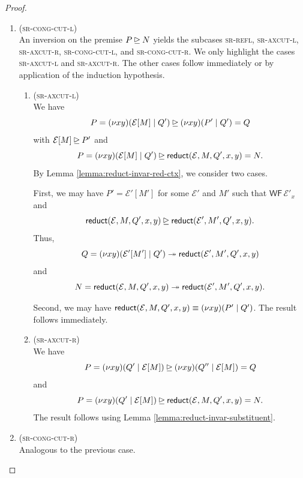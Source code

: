 \begin{proof}
\begin{enumerate}[itemsep=1em, label=Case:, leftmargin=*]
    \item (\textsc{sr-cong-cut-l}) \\
      An inversion on the premise $P \unrhd N$ yields the subcases
      \textsc{sr-refl}, \textsc{sr-axcut-l}, \textsc{sr-axcut-r}, \textsc{sr-cong-cut-l},
      and \textsc{sr-cong-cut-r}. We only highlight the cases
      \textsc{sr-axcut-l} and \textsc{sr-axcut-r}. The other cases follow
      immediately or by application of the induction hypothesis.
      \begin{enumerate}[itemsep=1em, label=Subcase:]
        \item (\textsc{sr-axcut-l}) \\
          We have
          \[
            P = (\nu x y)(\mathcal{E}[M] \mid Q') \unrhd (\nu x y)(P' \mid Q') = Q
          \]
          with $\mathcal{E}[M] \unrhd P'$ and
          \[
            P = (\nu x y)(\mathcal{E}[M] \mid Q') \unrhd \mathsf{reduct}(\mathcal{E}, M, Q', x, y) = N.
          \]
          By Lemma \ref{lemma:reduct-invar-red-ctx}, we consider two cases.

          First, we may have $P' = \mathcal{E}'[M']$ for some $\mathcal{E}'$ and $M'$
          such that $\mathsf{WF} \, \mathcal{E}'_x$ and
          \[
            \mathsf{reduct}(\mathcal{E}, M, Q', x, y) \unrhd \mathsf{reduct}(\mathcal{E}', M', Q', x, y).
          \]
          Thus,
          \[
            Q = (\nu x y)(\mathcal{E}'[M'] \mid Q')
            \twoheadrightarrow \mathsf{reduct}(\mathcal{E}', M', Q', x, y)
          \]
          and
          \[
            N = \mathsf{reduct}(\mathcal{E}, M, Q', x, y) \twoheadrightarrow \mathsf{reduct}(\mathcal{E}', M', Q', x, y).
          \]

          Second, we may have $\mathsf{reduct}(\mathcal{E}, M, Q', x, y) \equiv (\nu x y)(P' \mid Q')$.
          The result follows immediately.
        \item (\textsc{sr-axcut-r}) \\
          We have
          \[
            P = (\nu x y)(Q' \mid \mathcal{E}[M]) \unrhd (\nu x y)(Q'' \mid \mathcal{E}[M]) = Q
          \]
          and
          \[
            P = (\nu x y)(Q' \mid \mathcal{E}[M]) \unrhd \mathsf{reduct}(\mathcal{E}, M, Q', x, y) = N.
          \]
          The result follows using Lemma \ref{lemma:reduct-invar-substituent}.
      \end{enumerate}
    \item (\textsc{sr-cong-cut-r}) \\
      Analogous to the previous case.


\end{enumerate}
\end{proof}
